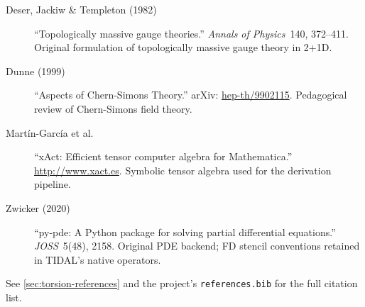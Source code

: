 \begin{description}
  \item[Deser, Jackiw \& Templeton (1982)] ``Topologically massive gauge theories.'' \emph{Annals of Physics}\ 140, 372--411. Original formulation of topologically massive gauge theory in 2+1D.
  \item[Dunne (1999)] ``Aspects of Chern-Simons Theory.'' arXiv: \href{https://arxiv.org/abs/hep-th/9902115}{hep-th/9902115}. Pedagogical review of Chern-Simons field theory.
  \item[Mart\'in-Garc\'ia et al.~\cite{martingarcia2007xact}] ``xAct: Efficient tensor computer algebra for Mathematica.'' \url{http://www.xact.es}. Symbolic tensor algebra used for the derivation pipeline.
  \item[Zwicker (2020)] ``py-pde: A Python package for solving partial differential equations.'' \emph{JOSS}\ 5(48), 2158. Original PDE backend; FD stencil conventions retained in TIDAL's native operators.
\end{description}

See \cref{sec:torsion-references} and the project's \texttt{references.bib} for the full citation list.
